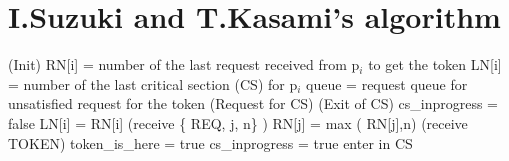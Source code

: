 \documentclass{article}
\begin{document}
\section{I.Suzuki and T.Kasami's algorithm}


\begin{algorithm}
\Begin(Init){
	RN[i] = number of the last request received from p$_{i}$ to get the token\;
	LN[i] = number of the last critical section (CS) for p$_i$\;
	queue = request queue for unsatisfied request for the token
}
\Begin(Request for CS){
}
\Begin(Exit of CS){
	cs\_inprogress = false\;
	LN[i] = RN[i]
}
\Begin(receive \{ REQ, j, n\} ){
	RN[j] = max ( RN[j],n)\;
}
\Begin(receive TOKEN){
	token\_is\_here = true\;
	cs\_inprogress = true\;
	enter in CS\;
}
\end{algorithm}
\end{document}
